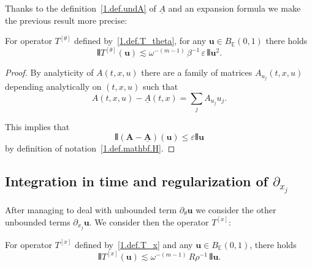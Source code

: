 \documentclass[AHL,Unicode,longabstracts,published]{cedram}
\theoremstyle{plain}
\newcommand*\e{\varepsilon}
\newcommand{\dptl}{\partial}%
\newcommand*\EE{{\mathbb E}}
\newcommand{\ubf}{{\mathbf u}}
\newcommand*\und{\underline}
\DeclarePairedDelimiter{\VERT}{|\mkern -1.6mu|\mkern -1.6mu|}{|\mkern -1.6mu|\mkern -1.6mu|}
\begin{document}
Thanks to the definition~\eqref{1.def.undA} of $\und{A}$ and an expansion formula we make the previous result more precise:

\begin{coro}\label{1.reg_dtheta.bis}
For operator $T^{[\theta]}$ defined by~\eqref{1.def.T_theta}, for any $\ubf\in B_{\EE}(0,1)$ there holds
\begin{equation}\label{1.esti.reg_dtheta.bis}
\VERT{T^{[\theta]}(\ubf)} \lesssim \omega^{-(m-1)}\,\beta^{-1}\, \e \,\VERT{\ubf}^2.
\end{equation}
\end{coro}

\begin{proof}
By analyticity of $A(t,x,u)$ there are a family of matrices $A_{u_j}(t,x,u)$ depending analytically on $(t,x,u)$ such that
\[
A(t,x,u) - \und{A}(t,x) = \sum_j A_{u_j} u_j.
\]


This implies that
\[
\VERT{({\mathbf A} - \und{{\mathbf A}})(\ubf)} \leq \e \VERT{\ubf}
\]
by definition of notation~\eqref{1.def.mathbf.H}.
\end{proof}



\subsection{Integration in time and regularization of \texorpdfstring{$\dptl_{x_j}$}{dxj}}



After managing to deal with unbounded term $\dptl_{\theta}\ubf$ we consider the other unbounded terms $\dptl_{x_j}\ubf$. We consider then the operator $T^{[x]}$:

\begin{prop}\label{1.reg_dx}
For operator $T^{[x]}$ defined by~\eqref{1.def.T_x} and any $\ubf\in B_{\EE}(0,1)$, there holds
\begin{equation}\label{1.esti.reg_dx}
\VERT{T^{[x]}(\ubf)} \lesssim \omega^{-(m-1)}\,R\rho^{-1}\,\VERT{\ubf}.
\end{equation}
\end{prop}
\end{document}
